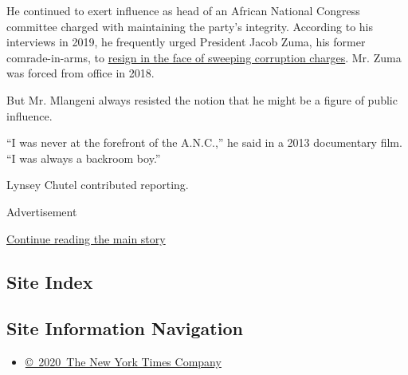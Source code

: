 He continued to exert influence as head of an African National Congress
committee charged with maintaining the party's integrity. According to
his interviews in 2019, he frequently urged President Jacob Zuma, his
former comrade-in-arms, to
\href{https://www.nytimes3xbfgragh.onion/2018/12/22/world/africa/gupta-zuma-south-africa-corruption.html}{resign
in the face of sweeping corruption charges}. Mr. Zuma was forced from
office in 2018.

But Mr. Mlangeni always resisted the notion that he might be a figure of
public influence.

``I was never at the forefront of the A.N.C.,'' he said in a 2013
documentary film. ``I was always a backroom boy.''

Lynsey Chutel contributed reporting.

Advertisement

\protect\hyperlink{after-bottom}{Continue reading the main story}

\hypertarget{site-index}{%
\subsection{Site Index}\label{site-index}}

\hypertarget{site-information-navigation}{%
\subsection{Site Information
Navigation}\label{site-information-navigation}}

\begin{itemize}
\tightlist
\item
  \href{https://help.nytimes3xbfgragh.onion/hc/en-us/articles/115014792127-Copyright-notice}{©~2020~The
  New York Times Company}
\end{itemize}

